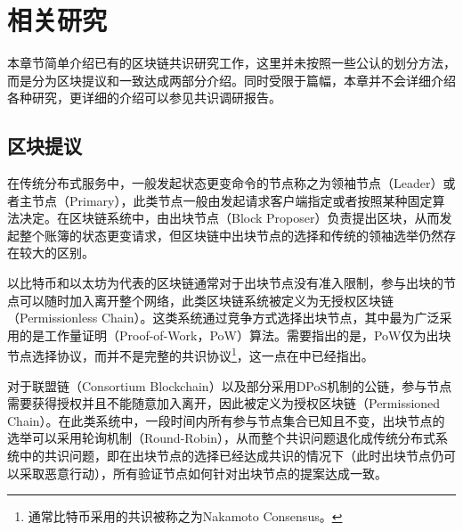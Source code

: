 \section{相关研究}
本章节简单介绍已有的区块链共识研究工作，这里并未按照一些公认的划分方法\cite{wang2019survey,bano2017consensus}，而是分为区块提议和一致达成两部分介绍。同时受限于篇幅，本章并不会详细介绍各种研究，更详细的介绍可以参见共识调研报告\cite{nebulassurvey2019}。

\subsection{区块提议}
在传统分布式服务中，一般发起状态更变命令的节点称之为领袖节点（Leader）或者主节点（Primary），此类节点一般由发起请求客户端指定或者按照某种固定算法决定\cite{castro1999practical}。在区块链系统中，由出块节点（Block Proposer）负责提出区块，从而发起整个账簿的状态更变请求，但区块链中出块节点的选择和传统的领袖选举仍然存在较大的区别。%







以比特币\cite{nakamoto2008bitcoin}和以太坊\cite{wood2014ethereum}为代表的区块链通常对于出块节点没有准入限制，参与出块的节点可以随时加入离开整个网络，此类区块链系统被定义为无授权区块链（Permissionless Chain）\cite{pass2017rethinking}。这类系统通过竞争方式选择出块节点，其中最为广泛采用的是工作量证明（Proof-of-Work，PoW）算法\cite{dwork1992pricing}。需要指出的是，PoW仅为出块节点选择协议，而并不是完整的共识协议\footnote{通常比特币采用的共识被称之为Nakamoto Consensus。}，这一点在\cite{nakamoto2008bitcoin}中已经指出。

对于联盟链（Consortium Blockchain）以及部分采用DPoS机制的公链\cite{grigg2017eos}，参与节点需要获得授权并且不能随意加入离开，因此被定义为授权区块链（Permissioned Chain）\cite{pass2017rethinking}。在此类系统中，一段时间内所有参与节点集合已知且不变，出块节点的选举可以采用轮询机制（Round-Robin），从而整个共识问题退化成传统分布式系统中的共识问题，即在出块节点的选择已经达成共识的情况下（此时出块节点仍可以采取恶意行动），所有验证节点如何针对出块节点的提案达成一致\cite{castro1999practical}。

